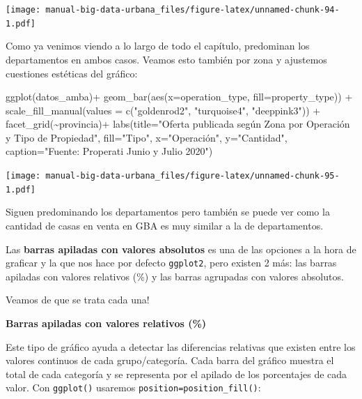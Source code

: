 \documentclass[
  spanish,
]{book}
\newenvironment{Shaded}{\begin{snugshade}}{\end{snugshade}}
\newcommand{\AttributeTok}[1]{\textcolor[rgb]{0.77,0.63,0.00}{#1}}
\newcommand{\FunctionTok}[1]{\textcolor[rgb]{0.00,0.00,0.00}{#1}}
\newcommand{\NormalTok}[1]{#1}
\newcommand{\SpecialCharTok}[1]{\textcolor[rgb]{0.00,0.00,0.00}{#1}}
\newcommand{\StringTok}[1]{\textcolor[rgb]{0.31,0.60,0.02}{#1}}
\begin{document}
\texttt{[image: manual-big-data-urbana\_files/figure-latex/unnamed-chunk-94-1.pdf]}

Como ya venimos viendo a lo largo de todo el capítulo, predominan los departamentos en ambos casos. Veamos esto también por zona y ajustemos cuestiones estéticas del gráfico:

\begin{Shaded}
\begin{Highlighting}[]
\FunctionTok{ggplot}\NormalTok{(datos\_amba)}\SpecialCharTok{+}
  \FunctionTok{geom\_bar}\NormalTok{(}\FunctionTok{aes}\NormalTok{(}\AttributeTok{x=}\NormalTok{operation\_type, }\AttributeTok{fill=}\NormalTok{property\_type)) }\SpecialCharTok{+}
  \FunctionTok{scale\_fill\_manual}\NormalTok{(}\AttributeTok{values =} \FunctionTok{c}\NormalTok{(}\StringTok{"goldenrod2"}\NormalTok{, }\StringTok{"turquoise4"}\NormalTok{, }\StringTok{"deeppink3"}\NormalTok{)) }\SpecialCharTok{+}
  \FunctionTok{facet\_grid}\NormalTok{(}\SpecialCharTok{\textasciitilde{}}\NormalTok{provincia)}\SpecialCharTok{+}
  \FunctionTok{labs}\NormalTok{(}\AttributeTok{title=}\StringTok{"Oferta publicada según Zona por Operación y Tipo de Propiedad"}\NormalTok{,}
       \AttributeTok{fill=}\StringTok{"Tipo"}\NormalTok{,}
       \AttributeTok{x=}\StringTok{"Operación"}\NormalTok{,}
       \AttributeTok{y=}\StringTok{"Cantidad"}\NormalTok{,}
       \AttributeTok{caption=}\StringTok{"Fuente: Properati Junio y Julio 2020"}\NormalTok{)}
\end{Highlighting}
\end{Shaded}

\texttt{[image: manual-big-data-urbana\_files/figure-latex/unnamed-chunk-95-1.pdf]}

Siguen predominando los departamentos pero también se puede ver como la cantidad de casas en venta en GBA es muy similar a la de departamentos.

Las \textbf{barras apiladas con valores absolutos} es una de las opciones a la hora de graficar y la que nos hace por defecto \texttt{ggplot2}, pero existen 2 más: las barras apiladas con valores relativos (\%) y las barras agrupadas con valores absolutos.

Veamos de que se trata cada una!

\textbf{Barras apiladas con valores relativos (\%)}

Este tipo de gráfico ayuda a detectar las diferencias relativas que existen entre los valores continuos de cada grupo/categoría. Cada barra del gráfico muestra el total de cada categoría y se representa por el apilado de los porcentajes de cada valor. Con \texttt{ggplot()} usaremos \texttt{position=position\_fill()}:
\end{document}
